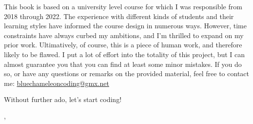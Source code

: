 This book is based on a university level course for which I was responsible from 2018 through 2022. The experience with different kinds of students and their learning styles have informed the course design in numerous ways. However, time constraints have always curbed my ambitions, and I'm thrilled to expand on my prior work. Ultimatively, of course, this is a piece of human work, and therefore likely to be flawed. I put a lot of effort into the totality of this project, but I can almost guarantee you that you can find at least some minor mistakes. If you do so, or have any questions or remarks on the provided material, feel free to contact me: \url{bluechameleoncoding@gmx.net}

Without further ado, let's start coding!
\begin{flushright}
\myName, \myVersionTime
\end{flushright}